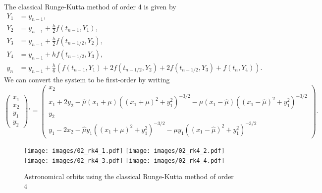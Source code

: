 \begin{solution}
  The classical Runge-Kutta method of order 4 is given by 
  \begin{align*}
    Y_1 &= y_{n-1}, \\
    Y_2 &= y_{n-1} + \frac{h}{2} f(t_{n-1}, Y_1), \\
    Y_3 &= y_{n-1} + \frac{h}{2} f(t_{n-1/2}, Y_2), \\
    Y_4 &= y_{n-1} + h f(t_{n-1/2}, Y_3), \\
    y_n &= y_{n-1} + \frac{h}{6} \left( f(t_{n-1}, Y_1) + 2 f(t_{n-1/2}, Y_2) + 2 f(t_{n-1/2}, Y_3) + f(t_n, Y_4)\right).
  \end{align*}
  We can convert the system to be first-order by writing
  \[
    \begin{pmatrix}
      x_1 \\ x_2 \\ y_1 \\ y_2
    \end{pmatrix}'
    = 
    \begin{pmatrix}
      x_2 \\
      x_1 + 2y_2 - \hat{\mu}(x_1 + \mu)((x_1 + \mu)^2 + y_1^2)^{-3/2} - \mu(x_1 - \hat{\mu})((x_1 - \hat{\mu})^2 + y_1^2)^{-3/2} \\
      y_2 \\
      y_1 - 2x_2 - \hat{\mu}y_1((x_1 + \mu)^2 + y_1^2)^{-3/2} - \mu y_1((x_1 - \hat{\mu})^2 + y_1^2)^{-3/2}
    \end{pmatrix}.
  \]
  
  \begin{figure}
    \centering
    \texttt{[image: images/02\_rk4\_1.pdf]}
    \texttt{[image: images/02\_rk4\_2.pdf]}
    \texttt{[image: images/02\_rk4\_3.pdf]}
    \texttt{[image: images/02\_rk4\_4.pdf]}
    \caption{Astronomical orbits using the classical Runge-Kutta method of order 4}
    \label{F:rk4}
  \end{figure}
  
\end{solution}